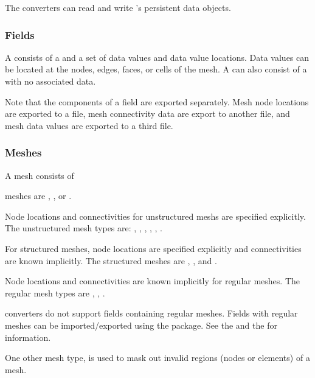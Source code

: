 The converters can read and write \sr{}'s persistent data objects.

\subsubsection{Fields}

A \sr{}  consists of a  and a set of
data values and data value locations.  Data values can be located at
the nodes, edges, faces, or cells of the mesh.  A  can
also consist of a  with no associated data.

Note that the components of a field are exported separately.  Mesh
node locations are exported to a file, mesh connectivity data are
export to another file, and mesh data values are exported to a third
file.


\subsubsection{Meshes}

A \sr{} mesh consists of 

\sr{} meshes are , , or
.  

Node locations and connectivities for unstructured meshs are specified
explicitly.  The unstructured mesh types are:
, ,
, ,
, .

For structured meshes, node locations are specified explicitly and
connectivities are known implicitly.  The structured meshes are
, , and
.

Node locations and connectivities are known implicitly for regular
meshes.  The regular mesh types are ,
, .


\sr{} converters do not support fields containing regular meshes.
Fields with regular meshes can be imported/exported using the
 package.  
See the  and
the 
for information.

One other mesh type,  is used to mask out
invalid regions (nodes or elements) of a mesh.

